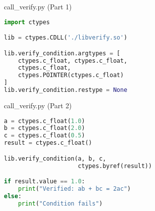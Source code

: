 \documentclass{beamer}
\begin{document}
\begin{frame}[fragile]{call\_verify.py (Part 1)}
\begin{lstlisting}[language=Python]
import ctypes

lib = ctypes.CDLL('./libverify.so')

lib.verify_condition.argtypes = [
    ctypes.c_float, ctypes.c_float,
    ctypes.c_float,
    ctypes.POINTER(ctypes.c_float)
]
lib.verify_condition.restype = None
\end{lstlisting}
\end{frame}


\begin{frame}[fragile]{call\_verify.py (Part 2)}
\begin{lstlisting}[language=Python]
a = ctypes.c_float(1.0)
b = ctypes.c_float(2.0)
c = ctypes.c_float(0.5)
result = ctypes.c_float()

lib.verify_condition(a, b, c,
                     ctypes.byref(result))

if result.value == 1.0:
    print("Verified: ab + bc = 2ac")
else:
    print("Condition fails")
\end{lstlisting}
\end{frame}
\end{document}

